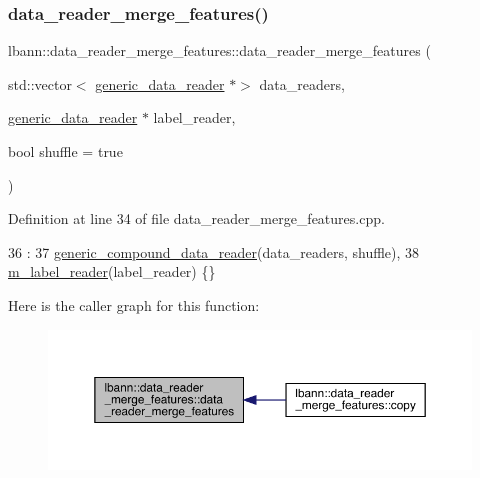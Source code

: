 \subsubsection{\texorpdfstring{data\+\_\+reader\+\_\+merge\+\_\+features()}{data\_reader\_merge\_features()}\hspace{0.1cm}{\footnotesize\ttfamily [1/2]}}
{\footnotesize\ttfamily lbann\+::data\+\_\+reader\+\_\+merge\+\_\+features\+::data\+\_\+reader\+\_\+merge\+\_\+features (\begin{DoxyParamCaption}\item[{std\+::vector$<$ \hyperlink{classlbann_1_1generic__data__reader}{generic\+\_\+data\+\_\+reader} $\ast$$>$}]{data\+\_\+readers,  }\item[{\hyperlink{classlbann_1_1generic__data__reader}{generic\+\_\+data\+\_\+reader} $\ast$}]{label\+\_\+reader,  }\item[{bool}]{shuffle = {\ttfamily true} }\end{DoxyParamCaption})}



Definition at line 34 of file data\+\_\+reader\+\_\+merge\+\_\+features.\+cpp.


\begin{DoxyCode}
36                                                    :
37   \hyperlink{classlbann_1_1generic__compound__data__reader_ab2ed3059169e556e4310a55fa99c1f07}{generic\_compound\_data\_reader}(data\_readers, shuffle),
38   \hyperlink{classlbann_1_1data__reader__merge__features_a1e54a136c63b934f44ff91dc68ea3b27}{m\_label\_reader}(label\_reader) \{\}
\end{DoxyCode}
Here is the caller graph for this function\+:\nopagebreak
\begin{figure}[H]
\begin{center}
\leavevmode
\includegraphics[width=350pt]{classlbann_1_1data__reader__merge__features_ac05d7a06c3a5749afc41c3b86bb2475d_icgraph}
\end{center}
\end{figure}
\mbox{\label{classlbann_1_1data__reader__merge__features_a41d55ea605d94ea010126b11ee420778}} 
